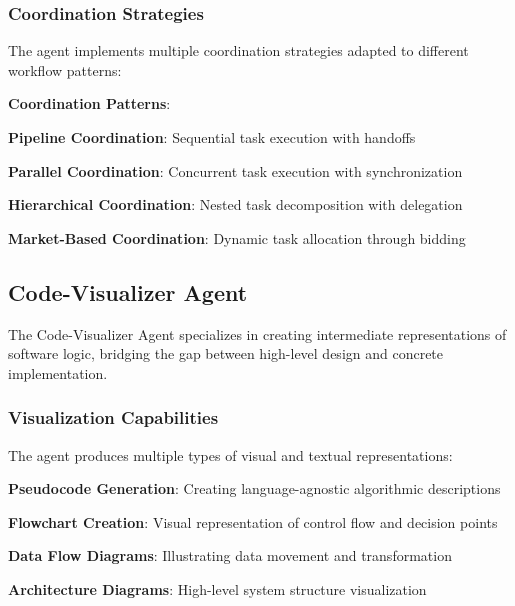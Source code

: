 \subsubsection*{Coordination Strategies}

The agent implements multiple coordination strategies adapted to different workflow patterns:

\begin{successbox}
\textbf{Coordination Patterns}:
\begin{compactlist}
    \item \textbf{Pipeline Coordination}: Sequential task execution with handoffs
    \item \textbf{Parallel Coordination}: Concurrent task execution with synchronization
    \item \textbf{Hierarchical Coordination}: Nested task decomposition with delegation
    \item \textbf{Market-Based Coordination}: Dynamic task allocation through bidding
\end{compactlist}
\end{successbox}

\subsection*{Code-Visualizer Agent}

The Code-Visualizer Agent specializes in creating intermediate representations of software logic, bridging the gap between high-level design and concrete implementation.

\subsubsection*{Visualization Capabilities}

The agent produces multiple types of visual and textual representations:

\begin{compactlist}
    \item \textbf{Pseudocode Generation}: Creating language-agnostic algorithmic descriptions
    \item \textbf{Flowchart Creation}: Visual representation of control flow and decision points
    \item \textbf{Data Flow Diagrams}: Illustrating data movement and transformation
    \item \textbf{Architecture Diagrams}: High-level system structure visualization
\end{compactlist}

